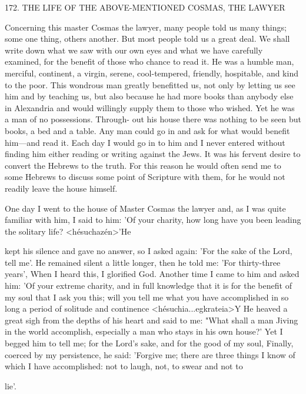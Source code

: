 172.
THE LIFE OF THE ABOVE-MENTIONED
COSMAS, THE LAWYER

Concerning this master Cosmas the lawyer, many people told us
many things; some one thing, others another.
But most people told
us a great deal.
We shall write down what we saw with our own
eyes and what we have carefully examined, for the benefit of those
who chance to read it.
He was a humble man, merciful, continent,
a virgin, serene, cool-tempered, friendly, hospitable, and kind to the
poor.
This wondrous man greatly benefitted us, not only by letting
us see him and by teaching us, but also because he had more books
than anybody else in Alexandria and would willingly supply them
to those who wished.
Yet he was a man of no possessions.
Through-
out his house there was nothing to be seen but books, a bed and a
table.
Any man could go in and ask for what would benefit
him—and read it.
Each day I would go in to him and I never
entered without finding him either reading or writing against the
Jews.
It was his fervent desire to convert the Hebrews to the truth.
For this reason he would often send me to some Hebrews to discuss
some point of Scripture with them, for he would not readily leave
the house himself.

One day I went to the house of Master Cosmas the lawyer and,
as I was quite familiar with him, I said to him: 'Of your charity,
how long have you been leading the solitary life? <hésuchazén>'He

kept his silence and gave no answer, so I asked again: 'For the sake
of the Lord, tell me'.
He remained silent a little longer, then he told
me: 'For thirty-three years', When I heard this, I glorified God.
Another time I came to him and asked him: 'Of your extreme
charity, and in full knowledge that it is for the benefit of my soul
that I ask you this; will you tell me what you have accomplished in
so long a period of solitude and continence <hésuchia...egkrateia>Y
He heaved a great sigh from the depths of his heart and said to me:
"What shall a man Jiving in the world accomplish, especially a man
who stays in his own house?' Yet I begged him to tell me; for the
Lord's sake, and for the good of my soul, Finally, coerced by my
persistence, he said: 'Forgive me; there are three things I know of
which I have accomplished: not to laugh, not, to swear and not to

lie'.

